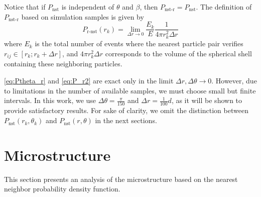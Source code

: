 \documentclass[11pt]{My_preprint}
\begin{document}
Notice that if $P_\text{nst}$ is independent of $\theta$ and $\beta$, then $P_\text{nst-r} = P_\text{nst}$. 
The definition of $P_\text{nst-r}$ based on simulation samples is given by 
\begin{equation}
    P_\text{r-nst}(r_k)
    =
    \lim_{\Delta r \to 0}
    \frac{E_k}{E}
    \frac{1}{4\pi  r_k^2  \Delta r }
    \label{eq:P_r2}
\end{equation}
where $E_k$ is the total number of events where the nearest particle pair verifies $r_{ij} \in [r_k ; r_k + \Delta r]$, and $4\pi  r_k^2  \Delta r$ corresponds to the volume of the spherical shell containing these neighboring particles. 

\ref{eq:Ptheta_r} and \ref{eq:P_r2} are exact only in the limit $\Delta r,\Delta \theta  \to 0$. 
However, due to limitations in the number of available samples, we must choose small but finite intervals.
In this work, we use $\Delta \theta = \frac{\pi}{150}$ and $\Delta r = \frac{1}{100}d$, as it will be shown to provide satisfactory results. 
For sake of clarity, we omit the distinction between $P_\text{nst}(r_k,\theta_k)$ and $P_\text{nst}(r,\theta)$ in the next sections.  
\section{Microstructure}
\label{sec:microstructure}
This section presents an analysis of the microstructure based on the nearest neighbor probability density function. 
\end{document}
